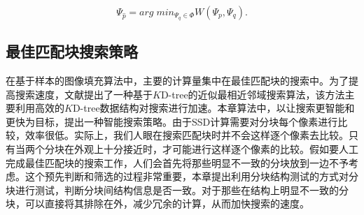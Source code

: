 $$\Psi_{\hat{p}}=arg\;min_{\Psi_q \in \Phi}{W(\Psi_p,\Psi_q)}.$$

\subsection{最佳匹配块搜索策略}
在基于样本的图像填充算法中，主要的计算量集中在最佳匹配块的搜索中。为了提高搜索速度，文献\cite{kwokFast}提出了一种基于$K$D-tree的近似最相近邻域搜索算法，该方法主要利用高效的$K$D-tree数据结构对搜索进行加速。本章算法中，以让搜索更智能和更快为目标，提出一种智能搜索策略。由于SSD计算需要对分块每个像素进行比较，效率很低。实际上，我们人眼在搜索匹配块时并不会这样逐个像素去比较。只有当两个分块在外观上十分接近时，才可能进行这样逐个像素的比较。假如要人工完成最佳匹配块的搜索工作，人们会首先将那些明显不一致的分块放到一边不予考虑。这个预先判断和筛选的过程非常重要，本章提出利用分块结构测试的方式对分块进行测试，判断分块间结构信息是否一致。对于那些在结构上明显不一致的分块，可以直接将其排除在外，减少冗余的计算，从而加快搜索的速度。
